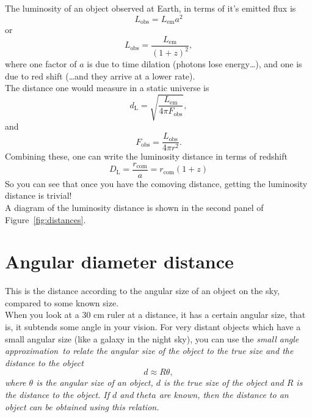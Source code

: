 \documentclass[]{article}
\begin{document}
\noindent The luminosity of an object observed at Earth, in terms of it’s emitted flux is 
\begin{equation}
L_\mathrm{obs} = L_\mathrm{em}a^2
\end{equation}
or
\begin{equation}
L_\mathrm{obs} = \frac{L_\mathrm{em}}{(1+z)^2},
\end{equation}
where one factor of $a$ is due to time dilation (photons lose energy…), and one is due to red shift (…and they arrive at a lower rate).\\

\noindent The distance one would measure in a static universe is
\begin{equation}
d_\mathrm{L} = \sqrt{\frac{L_\mathrm{em}}{4\pi F_\mathrm{obs}}},
\end{equation}
and 
\begin{equation}
F_\mathrm{obs} = \frac{L_\mathrm{obs}}{4\pi r^2}.
\end{equation}
Combining these, one can write the luminosity distance in terms of redshift
\begin{equation}
\boxed{D_\mathrm{L} = \frac{r_\mathrm{com}}{a} = r_\mathrm{com} (1+z)}
\end{equation}
So you can see that once you have the comoving distance, getting the luminosity distance is trivial! \\

\noindent A diagram of the luminosity distance is shown in the second panel of Figure~\ref{fig:distances}.

\section{Angular diameter distance}
This is the distance according to the angular size of an object on the sky, compared to some known size.\\ 

\noindent When you look at a 30 cm ruler at a distance, it has a certain angular size, that is, it subtends some angle in your vision. For very distant objects which have a small angular size (like a galaxy in the night sky), you can use the \itshape small angle approximation~\upshape to relate the angular size of the object to the true size and the distance to the object
\begin{equation}
d \approx R \theta,
\end{equation}
where $\theta$ is the angular size of an object, $d$ is the true size of the object and $R$ is the distance to the object. If $d$ and $theta$ are known, then the distance to an object can be obtained using this relation. \\
\end{document}

